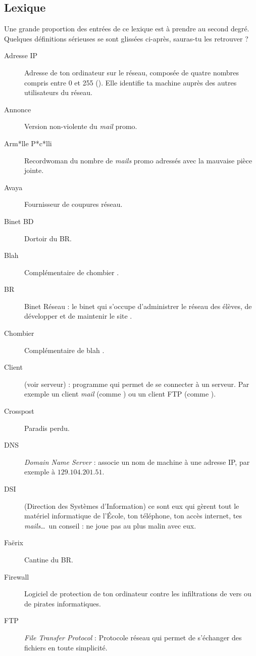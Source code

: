 \subsection{Lexique}

Une grande proportion des entrées de ce lexique est à prendre au second degré. Quelques définitions sérieuses se sont glissées ci-après, sauras-tu les retrouver ?

\begin{description}
  \item[Adresse IP] Adresse de ton ordinateur sur le réseau, composée de quatre nombres compris entre 0 et 255  (). Elle identifie ta machine auprès des autres utilisateurs du réseau.
  \item[Annonce] Version non-violente du \emph{mail} promo.
  \item[Arm*lle P*c*lli] Recordwoman du nombre de \emph{mails} promo adressés avec la mauvaise pièce jointe.
  \item[Avaya] Fournisseur de coupures réseau.
  \item[Binet BD] Dortoir du BR.
  \item[Blah] Complémentaire de \og chombier \fg.
  \item[BR] Binet Réseau : le binet qui s'occupe d'administrer le réseau des élèves, de développer et de maintenir le site .
  \item[Chombier] Complémentaire de \og blah \fg.
  \item[Client] (voir serveur) : programme qui permet de se connecter à un serveur. Par exemple un client \emph{mail}
	(comme ) ou un client FTP (comme ).
  \item[Crosspost] Paradis perdu.
  \item[DNS] \emph{Domain Name Server} : associe un nom de machine à une adresse IP, par exemple  à  $129.104.201.51$.
  \item[DSI] (Direction des Systèmes d'Information) ce sont eux qui gèrent tout le matériel informatique de l'\'Ecole, ton téléphone, ton accès internet, tes \emph{mails}\ldots\ un conseil : ne joue pas au plus malin avec eux.
  \item[Faërix] Cantine du BR.
  \item[Firewall] Logiciel de protection de ton ordinateur contre les infiltrations de vers ou de pirates informatiques.
  \item[FTP] \emph{File Transfer Protocol} : Protocole réseau qui permet de s'échanger des fichiers en toute simplicit\'e.

\end{description}
